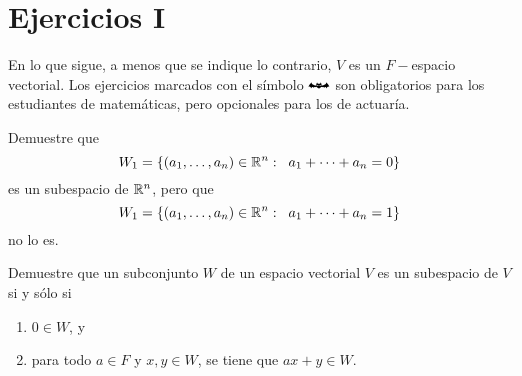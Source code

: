 \section{Ejercicios I}
	\label{section: ejercicios I}
En lo que sigue, a menos que se indique lo contrario,
$V$ es un $F-$espacio vectorial.
Los ejercicios marcados con el símbolo
$\mathbat$ son obligatorios para los estudiantes de matemáticas,
pero opcionales para los de actuaría.

\begin{ej}
    Demuestre que
    \[
    W_{1} = \{ (a_{1}, \ldots , a_{n}) \in \mathbb{R}^{n} : \hspace{0.2cm} 
    a_{1} + \cdots + a_{n} = 0\}
    \]
    es un subespacio de $\mathbb{R}^{n}$, pero que 
    \[
    W_{1} = \{ (a_{1}, \ldots , a_{n}) \in \mathbb{R}^{n} : \hspace{0.2cm} 
    a_{1} + \cdots + a_{n} = 1\}
    \]
    no lo es.
\end{ej}

\begin{ej}
    Demuestre que un subconjunto $W$ de un espacio vectorial $V$
    es un subespacio de $V$ si y sólo si
    \begin{enumerate}
        \item $0 \in W$, y
        \item para todo $a \in F$ y $x, y \in W$, se tiene que
        $ax + y \in W$.
    \end{enumerate}
\end{ej}

